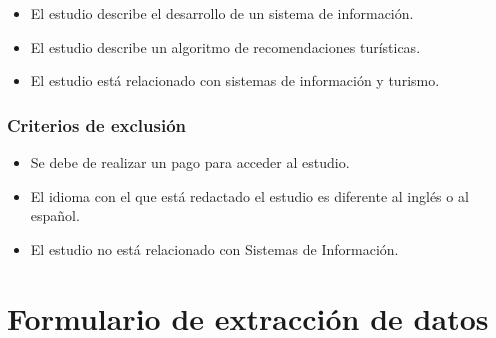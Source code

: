 \documentclass{report}
\begin{document}
\begin{itemize}
    \item{El estudio describe el desarrollo de un sistema de información.}
    \item{El estudio describe un algoritmo de recomendaciones turísticas.}
    \item{El estudio está relacionado con sistemas de información y turismo.}
\end{itemize}

\subsubsection{Criterios de exclusión}

\begin{itemize}
    \item{Se debe de realizar un pago para acceder al estudio.}
    \item{El idioma con el que está redactado el estudio es diferente al inglés
        o al español.}
    \item{El estudio no está relacionado con Sistemas de Información.}
\end{itemize}


\section{Formulario de extracción de datos}
\end{document}
